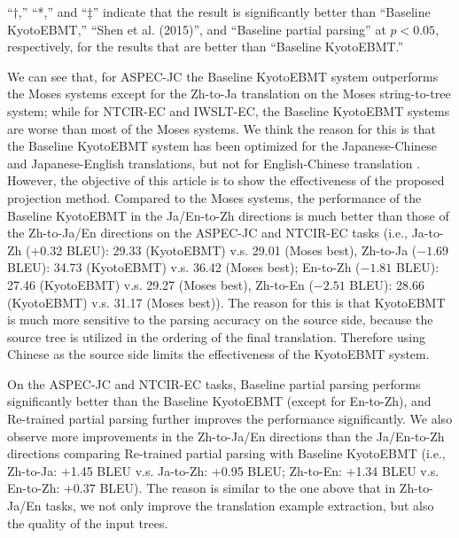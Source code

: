 \documentclass[english]{jnlp_1.4}
\begin{document}
\begin{table}[t]
\label{table:mt_result}

\vspace{4pt}\small
``$\dag$,'' ``*,'' and ``$\ddag$'' indicate that the result is significantly better than ``Baseline KyotoEBMT,'' {``Shen et al. (2015)''}, and ``Baseline partial parsing'' at {$p < 0.05$}, respectively, {for the results that are better than ``Baseline KyotoEBMT.'' }
\end{table}

We can see that, for ASPEC-JC the Baseline KyotoEBMT system outperforms the Moses systems 
{except for the Zh-to-Ja translation on the Moses string-to-tree system};
while for NTCIR-EC {and IWSLT-EC,} the Baseline KyotoEBMT systems are worse than {most of} the Moses systems. 
We think the reason for this is that the Baseline KyotoEBMT system has been 
optimized for the Japanese-Chinese and Japanese-English translations, but not for
English-Chinese translation \cite{richardson-EtAl:2015:WAT}. However, the objective
of this article is to show the effectiveness of the proposed projection method.
Compared to the Moses systems, the performance of the Baseline KyotoEBMT in the Ja/En-to-Zh directions
is much better than those of the Zh-to-Ja/En directions {on the ASPEC-JC
and NTCIR-EC tasks (i.e., Ja-to-Zh (+0.32 BLEU): 29.33 (KyotoEBMT) 
v.s. 29.01 (Moses best), Zh-to-Ja ($-1.69$ BLEU): 34.73 (KyotoEBMT) v.s. 36.42 (Moses best); 
En-to-Zh ($-1.81$ BLEU): 27.46 (KyotoEBMT) v.s. 29.27 (Moses best), Zh-to-En ($-2.51$ BLEU): 28.66 (KyotoEBMT) v.s. 31.17 (Moses best))}. 
The reason for this is that KyotoEBMT is much more sensitive to the parsing accuracy on the source side, because the source tree
is utilized in the ordering of the final translation. Therefore using Chinese as the source
side limits the effectiveness of the KyotoEBMT system. 

{On the ASPEC-JC and NTCIR-EC tasks,}
Baseline partial parsing performs significantly better than the Baseline KyotoEBMT 
(except for En-to-Zh), and Re-trained partial parsing further improves the
performance significantly. We also observe more improvements in the Zh-to-Ja/En
directions than the Ja/En-to-Zh directions {comparing Re-trained partial 
parsing with Baseline KyotoEBMT (i.e., Zh-to-Ja: +1.45 BLEU v.s. Ja-to-Zh: +0.95 BLEU;
Zh-to-En: +1.34 BLEU v.s. En-to-Zh: +0.37 BLEU)}. The reason is similar to the one above that in
Zh-to-Ja/En tasks, we not only improve the translation example extraction, but also
the quality of the input trees.
\end{document}
